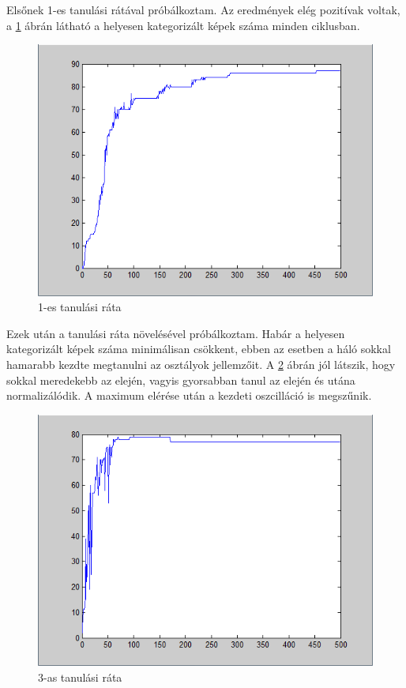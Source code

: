 Elsőnek 1-es tanulási rátával próbálkoztam. Az eredmények elég pozitívak voltak, a \ref{fig:learningrate1} ábrán látható a helyesen kategorizált képek száma minden ciklusban.

\begin{figure}
\centering

\includegraphics[scale=0.4]{images/Teszt2}
\caption{1-es tanulási ráta}

\label{fig:learningrate1}
\end{figure}

Ezek után a tanulási ráta növelésével próbálkoztam. Habár a helyesen kategorizált képek száma minimálisan csökkent, ebben az esetben a háló sokkal hamarabb kezdte megtanulni az osztályok jellemzőit. A \ref{fig:learningrate2} ábrán jól látszik, hogy sokkal meredekebb az elején, vagyis gyorsabban tanul az elején és utána normalizálódik. A maximum elérése után a kezdeti oszcilláció is megszűnik.

\begin{figure}
\centering

\includegraphics[scale=0.4]{images/Teszt3}
\caption{3-as tanulási ráta}

\label{fig:learningrate2}
\end{figure}

